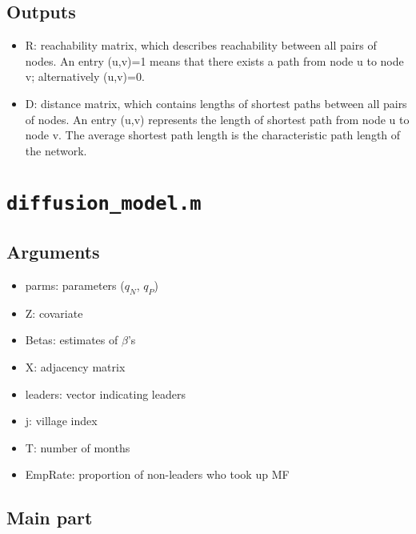\documentclass[10pt,letterpaper]{article}
\begin{document}
\subsection*{Outputs}
\begin{itemize}
	\item R: reachability matrix, which describes reachability between all pairs of nodes. An entry (u,v)=1 means that there exists a path from node u to node v; alternatively (u,v)=0.
	\item D: distance matrix, which contains lengths of shortest paths between all pairs of nodes. An entry (u,v) represents the length of shortest path from node u to  node v. The average shortest path length is the characteristic path length of the network.
\end{itemize}

\section{\texttt{diffusion\_model.m}}\label{diffusion_model}

\subsection*{Arguments}
\begin{itemize}
  \item parms: parameters ($q_N$, $q_P$)
  \item Z: covariate
  \item Betas: estimates of $\beta$'s 
  \item X: adjacency matrix
  \item leaders: vector indicating leaders
  \item j: village index
  \item T: number of months
  \item EmpRate: proportion of non-leaders who took up MF
\end{itemize}

\subsection*{Main part}
\end{document}
